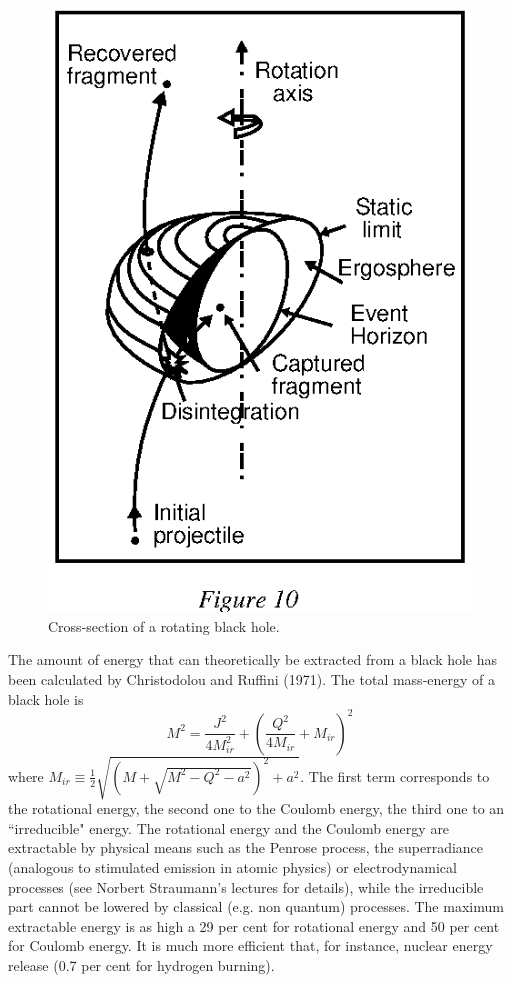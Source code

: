 \documentclass{lamuphys}
\begin{document}
\begin{figure}[tb]
  \begin{center}
    \leavevmode
    \includegraphics{ergo.ps}       
    \caption{Cross-section of a rotating black hole.}
  \end{center}
\end{figure}
The amount of energy that
can theoretically be extracted from a black hole has been calculated by
Christodolou and Ruffini (1971). The total mass-energy of a black hole is
\begin{equation}
        M^2 = \frac{J^2}{4M_{ir}^2} + (\frac{Q^2}{4 M_{ir}} + M_{ir})^2
\end{equation}
where 
$M_{ir} \equiv \frac{1}{2}\sqrt{\left(M+\sqrt{M^2-Q^2-a^2}\right)^2+a^2}$.
The first term corresponds to the rotational energy, the second one to the
Coulomb energy, the third one to an ``irreducible" energy.  The rotational
energy and the Coulomb energy are extractable by physical means such as
the Penrose process, the superradiance (analogous to stimulated emission in
atomic physics) or electrodynamical processes (see Norbert Straumann's
lectures for details), while the irreducible part
cannot be lowered by classical (e.g. non quantum) processes. The maximum
extractable  energy is as high a 29 per cent for rotational energy and 50 per
cent for Coulomb energy. It is much more efficient that, for instance,  nuclear
energy release (0.7 per cent for hydrogen burning). 
\end{document}
